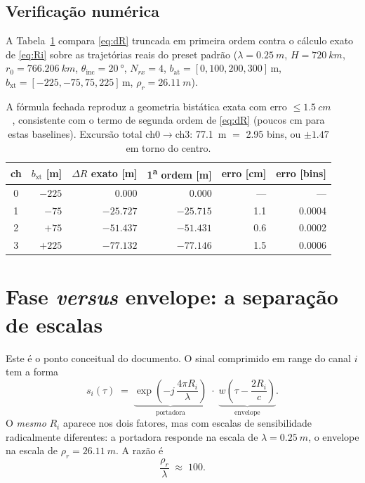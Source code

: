 \documentclass[11pt,a4paper]{article}
\newcommand{\bxt}{b_{\mathrm{xt}}}
\newcommand{\bat}{b_{\mathrm{at}}}
\newcommand{\thi}{\theta_{\mathrm{inc}}}
\newcommand{\rhor}{\rho_{r}}
\begin{document}
\subsection{Verificação numérica}

A Tabela~\ref{tab:verif} compara \eqref{eq:dR} truncada em primeira ordem
contra o cálculo exato de \eqref{eq:Ri} sobre as trajetórias reais do preset
padrão ($\lambda=\SI{0.25}{m}$, $H=\SI{720}{km}$, $r_0=\SI{766.206}{km}$,
$\thi=\SI{20}{\degree}$, $N_{rx}=4$, $\bat=[0,100,200,300]\,$m,
$\bxt=[-225,-75,75,225]\,$m, $\rhor = \SI{26.11}{m}$).

\begin{table}[h]
\centering
\begin{tabular}{crrrrr}
\toprule
ch & $\bxt$ [m] & $\Delta R$ exato [m] & 1\textsuperscript{a} ordem [m] & erro [cm] & erro [bins] \\
\midrule
0 & $-225$ & \num{0.000}   & \num{0.000}   & ---  & --- \\
1 & $-75$  & $-\num{25.727}$ & $-\num{25.715}$ & \num{1.1} & \num{0.0004} \\
2 & $+75$  & $-\num{51.437}$ & $-\num{51.431}$ & \num{0.6} & \num{0.0002} \\
3 & $+225$ & $-\num{77.132}$ & $-\num{77.146}$ & \num{1.5} & \num{0.0006} \\
\bottomrule
\end{tabular}
\caption{A fórmula fechada reproduz a geometria bistática exata com erro
$\le\SI{1.5}{cm}$, consistente com o termo de segunda ordem de
\eqref{eq:dR} (poucos cm para estas baselines). Excursão total
ch0$\to$ch3: \SI{77.1}{m} $=$ \num{2.95} bins, ou $\pm\num{1.47}$ em torno
do centro.}
\label{tab:verif}
\end{table}

\section{Fase \emph{versus} envelope: a separação de escalas}

Este é o ponto conceitual do documento. O sinal comprimido em range do canal
$i$ tem a forma
\begin{equation}
s_i(\tau) \;=\;
\underbrace{\exp\!\left(-j\,\frac{4\pi R_i}{\lambda}\right)}_{\text{portadora}}
\;\cdot\;
\underbrace{w\!\left(\tau - \frac{2R_i}{c}\right)}_{\text{envelope}} .
\label{eq:sinal}
\end{equation}
O \emph{mesmo} $R_i$ aparece nos dois fatores, mas com escalas de
sensibilidade radicalmente diferentes: a portadora responde na escala de
$\lambda = \SI{0.25}{m}$, o envelope na escala de $\rhor = \SI{26.11}{m}$.
A razão é
\begin{equation}
\frac{\rhor}{\lambda} \;\approx\; 100 .
\end{equation}
\end{document}
